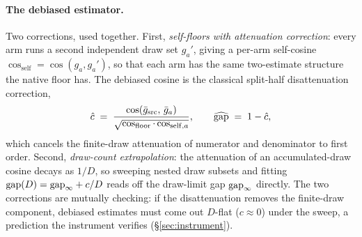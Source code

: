 \paragraph{The debiased estimator.}
Two corrections, used together. First, \emph{self-floors with
attenuation correction}: every arm runs a second independent draw set
$g_a'$, giving a per-arm self-cosine
$\cos_{\mathrm{self}} = \cos(g_a, g_a')$, so that each arm has the same
two-estimate structure the native floor has. The debiased cosine is
the classical split-half disattenuation correction,
\begin{equation}
\hat c \;=\; \frac{\cos(\bar g_{\mathrm{src}},\, \bar g_{a})}
{\sqrt{\cos_{\mathrm{floor}} \cdot \cos_{\mathrm{self},a}}},
\qquad
\widehat{\mathrm{gap}} \;=\; 1 - \hat c,
\label{eq:debias}
\end{equation}
which cancels the finite-draw attenuation of numerator and denominator
to first order. Second, \emph{draw-count extrapolation}: the
attenuation of an accumulated-draw cosine decays as $1/D$, so sweeping
nested draw subsets and fitting
$\mathrm{gap}(D) = \mathrm{gap}_\infty + c/D$ reads off the draw-limit gap
$\mathrm{gap}_\infty$ directly. The two corrections are mutually checking: if
the disattenuation removes the finite-draw component, debiased
estimates must come out $D$-flat ($c \approx 0$) under the sweep, a
prediction the instrument verifies (\S\ref{sec:instrument}).

